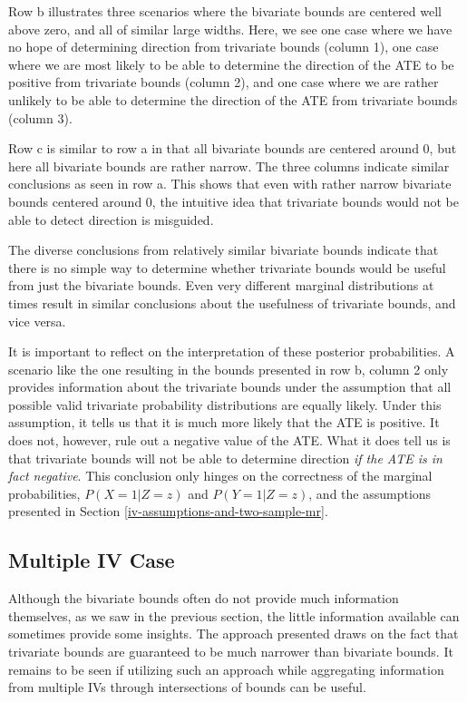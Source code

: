 \documentclass[
]{article}
\theoremstyle{plain}
\begin{document}
Row b illustrates three scenarios where the bivariate bounds are centered well above zero, and all of similar large widths. Here, we see one case where we have no hope of determining direction from trivariate bounds (column 1), one case where we are most likely to be able to determine the direction of the ATE to be positive from trivariate bounds (column 2), and one case where we are rather unlikely to be able to determine the direction of the ATE from trivariate bounds (column 3).

Row c is similar to row a in that all bivariate bounds are centered around 0, but here all bivariate bounds are rather narrow. The three columns indicate similar conclusions as seen in row a. This shows that even with rather narrow bivariate bounds centered around 0, the intuitive idea that trivariate bounds would not be able to detect direction is misguided.

The diverse conclusions from relatively similar bivariate bounds indicate that there is no simple way to determine whether trivariate bounds would be useful from just the bivariate bounds. Even very different marginal distributions at times result in similar conclusions about the usefulness of trivariate bounds, and vice versa.

It is important to reflect on the interpretation of these posterior probabilities. A scenario like the one resulting in the bounds presented in row b, column 2 only provides information about the trivariate bounds under the assumption that all possible valid trivariate probability distributions are equally likely. Under this assumption, it tells us that it is much more likely that the ATE is positive. It does not, however, rule out a negative value of the ATE. What it does tell us is that trivariate bounds will not be able to determine direction \emph{if the ATE is in fact negative}. This conclusion only hinges on the correctness of the marginal probabilities, \(P(X = 1 | Z = z)\) and \(P(Y = 1 | Z = z)\), and the assumptions presented in Section \ref{iv-assumptions-and-two-sample-mr}.

\hypertarget{multiple-iv-case}{%
\subsection{Multiple IV Case}\label{multiple-iv-case}}

Although the bivariate bounds often do not provide much information themselves, as we saw in the previous section, the little information available can sometimes provide some insights. The approach presented draws on the fact that trivariate bounds are guaranteed to be much narrower than bivariate bounds. It remains to be seen if utilizing such an approach while aggregating information from multiple IVs through intersections of bounds can be useful.
\end{document}
